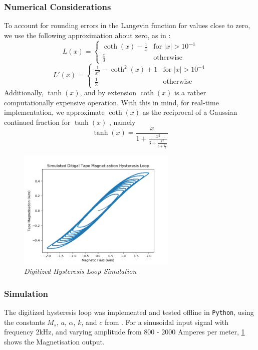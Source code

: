 \documentclass[twoside,a4paper]{article}
\begin{document}
\subsubsection{Numerical Considerations} \label{numerical}
To account for rounding errors in the Langevin function for values close to 
zero, we use the following approximation about zero, as in \cite{Hysteresis}:
\begin{equation}
    L(x) = \begin{cases}
        \coth(x) - \frac{1}{x} & \text{for $|x| > 10^{-4}$} \\
        \frac{x}{3} & \text{otherwise}
    \end{cases}
\end{equation}
\begin{equation}
    L'(x) = \begin{cases}
        \frac{1}{x^2} - \coth^{2}(x) + 1 & \text{for $|x| > 10^{-4}$} \\
        \frac{1}{3} & \text{otherwise}
    \end{cases}
\end{equation}
%
Additionally, $\tanh(x)$, and by extension $\coth(x)$ is a
rather computationally expensive operation. With this in mind,
for real-time implementation, we approximate $\coth(x)$ as the
reciprocal of a Gaussian continued fraction for $\tanh(x)$
\cite{MATH}, namely
\begin{equation}
    \tanh(x) = \frac{x}{1 + \frac{x^2}{3 + \frac{x^2}{5 + \frac{x^2}{7}}}}
    \label{eq:continuedFrac}
\end{equation}

\begin{figure}[ht]
    \center
    \includegraphics[width=3in]{../Simulations/Hysteresis/Sim2-M_H.png}
    \caption{\label{HysteresisSim}{\it Digitized Hysteresis Loop Simulation}}
\end{figure}
%
\subsubsection{Simulation}
The digitized hysteresis loop was implemented and tested offline
in \texttt{Python}, using the constants $M_s$, $a$, $\alpha$, $k$,
and $c$ from \cite{JilesAtherton1986}. For a sinusoidal input signal
with frequency 2kHz, and varying amplitude from 800 - 2000 Amperes per
meter, \cref{HysteresisSim} shows the Magnetisation output.
\end{document}
